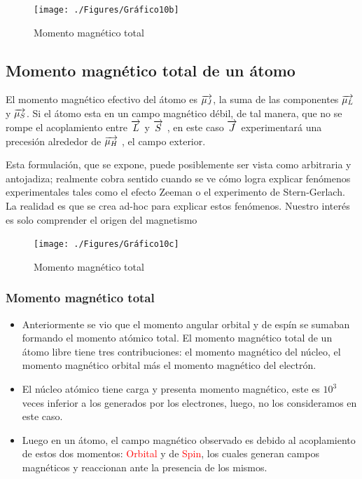 \begin{figure}[H]
    \centering
    \texttt{[image: ./Figures/Gráfico10b]}
	\caption{Momento magnético total}
	\label{fig:Grafico10c}
\end{figure}


\subsection{Momento magnético total de un átomo}

El momento magnético efectivo del átomo es $\overrightarrow{\mu_{J}}$, la suma de las componentes $\overrightarrow{\mu_{L}}$ y $\overrightarrow{\mu_{S}}$. Si el átomo esta en un campo magnético débil, de tal manera, que no se rompe el acoplamiento entre $\overrightarrow{L}$ y $\overrightarrow{S}$ , en este caso $\overrightarrow{J}$ experimentará una precesión alrededor de $\overrightarrow{\mu_{H}}$ , el campo exterior.

Esta formulación, que se expone, puede posiblemente ser vista como arbitraria y antojadiza; realmente cobra sentido cuando se ve cómo logra explicar fenómenos experimentales tales como el efecto Zeeman o el experimento de Stern-Gerlach. La realidad es que se crea ad-hoc para explicar estos fenómenos. Nuestro interés es solo comprender el origen del magnetismo

\begin{figure}[H]
    \centering
    \texttt{[image: ./Figures/Gráfico10c]}
	\caption{Momento magnético total}
	\label{fig:Grafico10c}
\end{figure}


\subsubsection{Momento magnético total}

\begin{itemize}
\item Anteriormente se vio que el momento angular orbital y de espín se sumaban formando el momento atómico total. El momento magnético total de un átomo libre tiene tres contribuciones: el momento magnético del núcleo, el momento magnético orbital más el momento magnético del electrón.
\item El núcleo atómico tiene carga y presenta momento magnético, este es $10^3$ veces inferior a los generados por los electrones, luego, no los consideramos en este caso.
\item Luego en un átomo, el campo magnético observado es debido al acoplamiento de estos dos momentos: \textcolor{red}{Orbital} y de \textcolor{red}{Spin}, los cuales generan campos magnéticos y reaccionan ante la presencia de los mismos.
\end{itemize}

